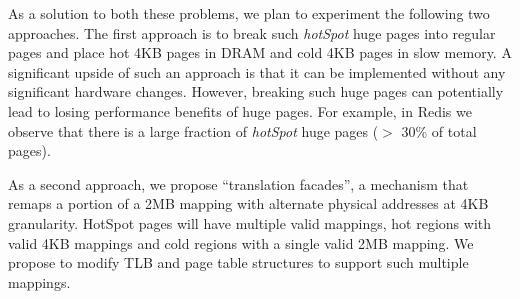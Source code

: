 As a solution to both these problems, we plan to experiment the following two
approaches. The first approach is to break such {\it hotSpot} huge pages into
regular pages and place hot 4KB pages in DRAM and cold 4KB pages in slow memory.
A significant upside of such an approach is that it can be implemented without
any significant hardware changes. However, breaking such huge pages can
potentially lead to losing performance benefits of huge pages. For example, in
Redis we observe that there is a large fraction of {\it hotSpot} huge pages ($>$
30\% of total pages).

As a second approach, we propose ``translation facades'', a mechanism that
remaps a portion of a 2MB mapping with alternate physical addresses at 4KB
granularity. HotSpot pages will have multiple valid mappings, hot regions with
valid 4KB mappings and cold regions with a single valid 2MB mapping. We propose
to modify TLB and page table structures to support such multiple mappings.
